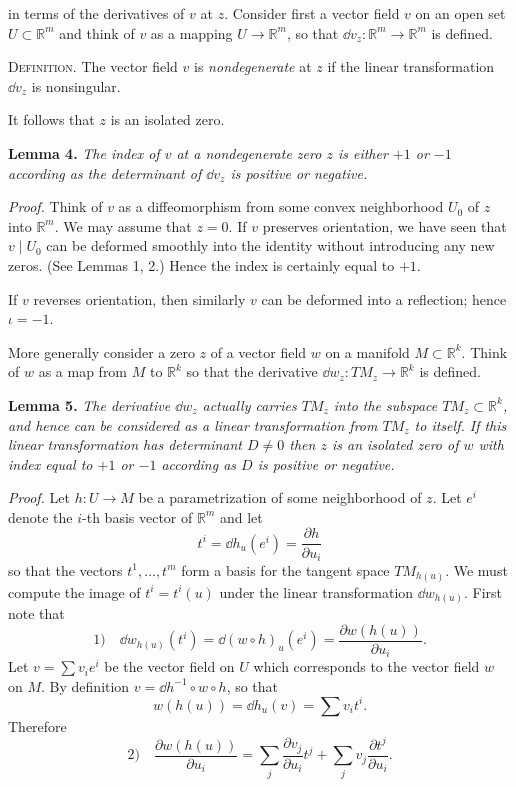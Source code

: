 
in terms of the derivatives of $v$ at $z$. Consider first a vector field $v$ on an open set $U \subset \mathbb{R}^m$ and think of $v$ as a mapping $U \to \mathbb{R}^m$, so that $\dd v_z : \mathbb{R}^m \to \mathbb{R}^m$ is defined.

\textsc{Definition.} The vector field $v$ is \emph{nondegenerate} at $z$ if the linear transformation $\dd v_z$ is nonsingular.

It follows that $z$ is an isolated zero.

\noindent\textbf{Lemma 4.} \textit{The index of $v$ at a nondegenerate zero $z$ is either $+1$ or $-1$ according as the determinant of $\dd v_z$ is positive or negative.}

\noindent\textit{Proof.}
Think of $v$ as a diffeomorphism from some convex neighborhood $U_0$ of $z$ into $\mathbb{R}^m$. We may assume that $z = 0$. If $v$ preserves orientation, we have seen that $v \mid U_0$ can be deformed smoothly into the identity without introducing any new zeros. (See Lemmas 1, 2.) Hence the index is certainly equal to $+1$.

If $v$ reverses orientation, then similarly $v$ can be deformed into a reflection; hence $\iota = -1$.

More generally consider a zero $z$ of a vector field $w$ on a manifold $M \subset \mathbb{R}^k$. Think of $w$ as a map from $M$ to $\mathbb{R}^k$ so that the derivative $\dd w_z : TM_z \to \mathbb{R}^k$ is defined.

\noindent\textbf{Lemma 5.} \textit{The derivative $\dd w_z$ actually carries $TM_z$ into the subspace $TM_z \subset \mathbb{R}^k$, and hence can be considered as a linear transformation from $TM_z$ to itself. If this linear transformation has determinant $D \neq 0$ then $z$ is an isolated zero of $w$ with index equal to $+1$ or $-1$ according as $D$ is positive or negative.}

\noindent\textit{Proof.}
Let $h : U \to M$ be a parametrization of some neighborhood of $z$. Let $e^i$ denote the $i$-th basis vector of $\mathbb{R}^m$ and let
\[
t^i = \dd h_u(e^i) = \frac{\partial h}{\partial u_i}
\]
so that the vectors $t^1, \ldots, t^m$ form a basis for the tangent space $TM_{h(u)}$. We must compute the image of $t^i = t^i(u)$ under the linear transformation $\dd w_{h(u)}$. First note that
\[
\text{1)} \quad \dd w_{h(u)}(t^i) = \dd(w \circ h)_u(e^i) = \frac{\partial w(h(u))}{\partial u_i}.
\]
Let $v = \sum v_i e^i$ be the vector field on $U$ which corresponds to the vector field $w$ on $M$. By definition $v = \dd h^{-1} \circ w \circ h$, so that
\[
w(h(u)) = \dd h_u(v) = \sum v_i t^i.
\]
Therefore
\[
\text{2)} \quad \frac{\partial w(h(u))}{\partial u_i} = \sum_j \frac{\partial v_j}{\partial u_i} t^j + \sum_j v_j \frac{\partial t^j}{\partial u_i}.
\]


